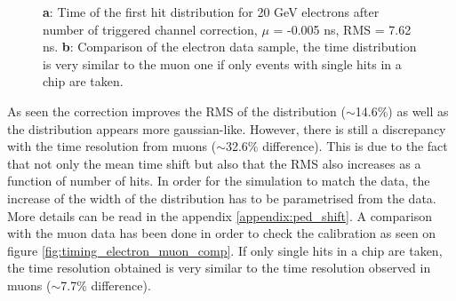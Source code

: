 \documentclass[twoside,a4paper,11pt]{article}
\begin{document}
\begin{figure}[htbp]
	\hfill
	\caption[]{\textbf{a}: Time of the first hit distribution for 20 GeV electrons after number of triggered channel correction, $\mu$ = -0.005 ns, RMS = 7.62 ns. \textbf{b}: Comparison of the electron data sample, the time distribution is very similar to the muon one if only events with single hits in a chip are taken.}
\end{figure}
As seen the correction improves the RMS of the distribution ($\sim$14.6\%) as well as the distribution appears more gaussian-like. However, there is still a discrepancy with the time resolution from muons ($\sim$32.6\% difference). This is due to the fact that not only the mean time shift but also that the RMS also increases as a function of number of hits. In order for the simulation to match the data, the increase of the width of the distribution has to be parametrised from the data. More details can be read in the appendix \ref{appendix:ped_shift}. A comparison with the muon data has been done in order to check the calibration as seen on figure \ref{fig:timing_electron_muon_comp}. If only single hits in a chip are taken, the time resolution obtained is very similar to the time resolution observed in muons ($\sim$7.7\% difference).
\end{document}
